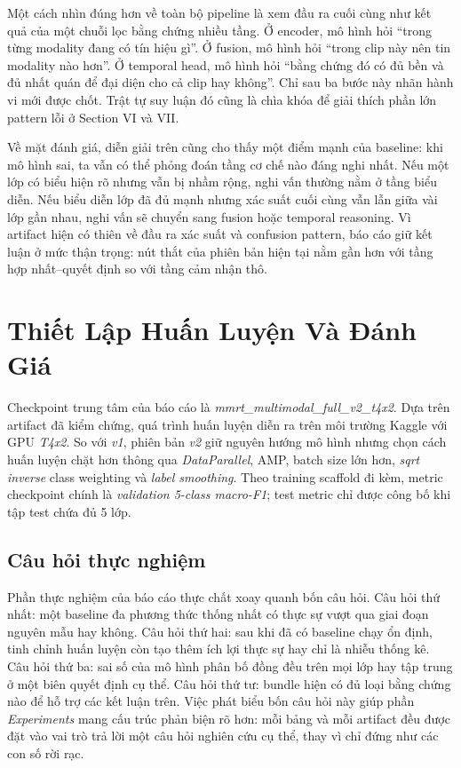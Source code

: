 \documentclass[conference,a4paper]{IEEEtran}
\begin{document}
Một cách nhìn đúng hơn về toàn bộ pipeline là xem đầu ra cuối cùng như kết quả của một chuỗi lọc bằng chứng nhiều tầng. Ở encoder, mô hình hỏi ``trong từng modality đang có tín hiệu gì''. Ở fusion, mô hình hỏi ``trong clip này nên tin modality nào hơn''. Ở temporal head, mô hình hỏi ``bằng chứng đó có đủ bền và đủ nhất quán để đại diện cho cả clip hay không''. Chỉ sau ba bước này nhãn hành vi mới được chốt. Trật tự suy luận đó cũng là chìa khóa để giải thích phần lớn pattern lỗi ở Section VI và VII.

Về mặt đánh giá, diễn giải trên cũng cho thấy một điểm mạnh của baseline: khi mô hình sai, ta vẫn có thể phỏng đoán tầng cơ chế nào đáng nghi nhất. Nếu một lớp có biểu hiện rõ nhưng vẫn bị nhầm rộng, nghi vấn thường nằm ở tầng biểu diễn. Nếu biểu diễn lớp đã đủ mạnh nhưng xác suất cuối cùng vẫn lẫn giữa vài lớp gần nhau, nghi vấn sẽ chuyển sang fusion hoặc temporal reasoning. Vì artifact hiện có thiên về đầu ra xác suất và confusion pattern, báo cáo giữ kết luận ở mức thận trọng: nút thắt của phiên bản hiện tại nằm gần hơn với tầng hợp nhất--quyết định so với tầng cảm nhận thô.

\section[Thiet Lap Huan Luyen Va Danh Gia]{Thiết Lập Huấn Luyện Và Đánh Giá}
Checkpoint trung tâm của báo cáo là \textit{mmrt\_multimodal\_full\_v2\_t4x2}. Dựa trên artifact đã kiểm chứng, quá trình huấn luyện diễn ra trên môi trường Kaggle với GPU \textit{T4x2}. So với \textit{v1}, phiên bản \textit{v2} giữ nguyên hướng mô hình nhưng chọn cách huấn luyện chặt hơn thông qua \textit{DataParallel}, AMP, batch size lớn hơn, \textit{sqrt inverse} class weighting và \textit{label smoothing}. Theo training scaffold đi kèm, metric checkpoint chính là \textit{validation 5-class macro-F1}; test metric chỉ được công bố khi tập test chứa đủ 5 lớp.

\subsection{Câu hỏi thực nghiệm}
Phần thực nghiệm của báo cáo thực chất xoay quanh bốn câu hỏi. Câu hỏi thứ nhất: một baseline đa phương thức thống nhất có thực sự vượt qua giai đoạn nguyên mẫu hay không. Câu hỏi thứ hai: sau khi đã có baseline chạy ổn định, tinh chỉnh huấn luyện còn tạo thêm ích lợi thực sự hay chỉ là nhiễu thống kê. Câu hỏi thứ ba: sai số của mô hình phân bố đồng đều trên mọi lớp hay tập trung ở một biên quyết định cụ thể. Câu hỏi thứ tư: bundle hiện có đủ loại bằng chứng nào để hỗ trợ các kết luận trên. Việc phát biểu bốn câu hỏi này giúp phần \textit{Experiments} mang cấu trúc phản biện rõ hơn: mỗi bảng và mỗi artifact đều được đặt vào vai trò trả lời một câu hỏi nghiên cứu cụ thể, thay vì chỉ đứng như các con số rời rạc.
\end{document}

